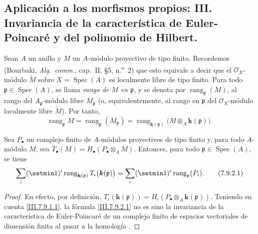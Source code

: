 \subsection{Aplicación a los morfismos propios: III. Invariancia de la
característica de Euler-Poincaré y del polinomio de Hilbert.}
\label{subsection:III.7.9}
\label{subsection:III.7.9.fr}
\label{III.7.9}
\label{III.7.9.fr}

\begin{env}[7.9.1]
\label{III.7.9.1}
\label{III.7.9.1.fr}
Sean $A$ un anillo y $M$ un $A$-módulo proyectivo de tipo finito.
Recordemos (Bourbaki, \emph{Alg.~comm.}, cap.~II, \S5, n.\textsuperscript{o}~2)
que esto equivale a decir que el $\mathscr O_X$-módulo $\widetilde M$ sobre
$X=\operatorname{Spec}(A)$ es localmente libre de tipo finito.
Para todo $\mathfrak p\in\operatorname{Spec}(A)$, se llama \emph{rango de $M$ en
$\mathfrak p$}, y se denota por $\operatorname{rang}_{\mathfrak p}(M)$,
al rango del $A_{\mathfrak p}$-módulo libre $M_{\mathfrak p}$ (o,
equivalentemente, al rango en $\mathfrak p$ del $\mathscr O_X$-módulo
localmente libre $\widetilde M$). Por tanto,
\[
  \operatorname{rang}_{\mathfrak p}M
  =\operatorname{rang}_{\mathfrak p}(M_{\mathfrak p})
  =\operatorname{rang}_{\mathbf{k}(\mathfrak p)}
  \bigl(M\otimes_A\boldsymbol{k}(\mathfrak p)\bigr).
  \tag{7.9.1.1}\label{III.7.9.1.1.fr}
\]
\end{env}

\begin{proposition}[7.9.2]
\label{III.7.9.2}
\label{III.7.9.2.fr}
Sea $P_\bullet$ un complejo finito de $A$-módulos proyectivos de
tipo finito y, para todo $A$-módulo $M$, sea $T_\bullet(M)=H_\bullet(P_\bullet\otimes_A M)$.
Entonces, para todo $\mathfrak p\in\operatorname{Spec}(A)$, se tiene
\[
  \sum_i(\setmin 1)^i\operatorname{rang}_{\mathbf{k}(\mathfrak p)}
  T_i\bigl(\boldsymbol{k}(\mathfrak p)\bigr)
  =\sum_i(\setmin 1)^i\operatorname{rang}_{\mathfrak p}(P_i).
  \tag{7.9.2.1}\label{III.7.9.2.1.fr}
\]
\end{proposition}

\begin{proof}
En efecto, por definición,
$T_i(\boldsymbol{k}(\mathfrak p))=H_i(P_\bullet\otimes_A\boldsymbol{k}(\mathfrak p))$.
Teniendo en cuenta \eqref{III.7.9.1.1}, la fórmula
\eqref{III.7.9.2.1} no es sino la invariancia de la característica
de Euler-Poincaré de un complejo finito de espacios vectoriales de
dimensión finita al pasar a la homología
.
\end{proof}

